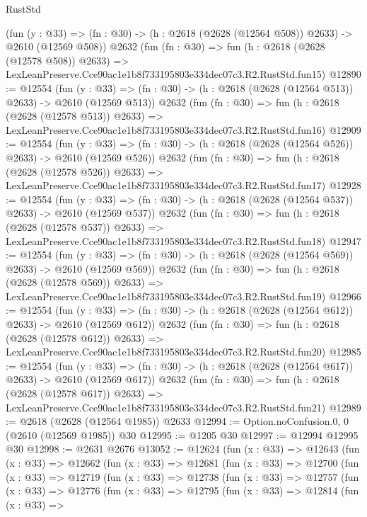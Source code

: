 \begin{lexlean}{RustStd}
\begin{coremodule}
    (fun (y : @33) => (fn : @30) -> (h : @2618 (@2628 (@12564 @508)) @2633) -> @2610 (@12569 @508))
    @2632
    (fun (fn : @30) =>
    fun (h : @2618 (@2628 (@12578 @508)) @2633) =>
    LexLeanPreserve.Cce90ac1e1b8f733195803e334dec07c3.R2.RustStd.fun15)
@12890 := @12554
    (fun (y : @33) => (fn : @30) -> (h : @2618 (@2628 (@12564 @513)) @2633) -> @2610 (@12569 @513))
    @2632
    (fun (fn : @30) =>
    fun (h : @2618 (@2628 (@12578 @513)) @2633) =>
    LexLeanPreserve.Cce90ac1e1b8f733195803e334dec07c3.R2.RustStd.fun16)
@12909 := @12554
    (fun (y : @33) => (fn : @30) -> (h : @2618 (@2628 (@12564 @526)) @2633) -> @2610 (@12569 @526))
    @2632
    (fun (fn : @30) =>
    fun (h : @2618 (@2628 (@12578 @526)) @2633) =>
    LexLeanPreserve.Cce90ac1e1b8f733195803e334dec07c3.R2.RustStd.fun17)
@12928 := @12554
    (fun (y : @33) => (fn : @30) -> (h : @2618 (@2628 (@12564 @537)) @2633) -> @2610 (@12569 @537))
    @2632
    (fun (fn : @30) =>
    fun (h : @2618 (@2628 (@12578 @537)) @2633) =>
    LexLeanPreserve.Cce90ac1e1b8f733195803e334dec07c3.R2.RustStd.fun18)
@12947 := @12554
    (fun (y : @33) => (fn : @30) -> (h : @2618 (@2628 (@12564 @569)) @2633) -> @2610 (@12569 @569))
    @2632
    (fun (fn : @30) =>
    fun (h : @2618 (@2628 (@12578 @569)) @2633) =>
    LexLeanPreserve.Cce90ac1e1b8f733195803e334dec07c3.R2.RustStd.fun19)
@12966 := @12554
    (fun (y : @33) => (fn : @30) -> (h : @2618 (@2628 (@12564 @612)) @2633) -> @2610 (@12569 @612))
    @2632
    (fun (fn : @30) =>
    fun (h : @2618 (@2628 (@12578 @612)) @2633) =>
    LexLeanPreserve.Cce90ac1e1b8f733195803e334dec07c3.R2.RustStd.fun20)
@12985 := @12554
    (fun (y : @33) => (fn : @30) -> (h : @2618 (@2628 (@12564 @617)) @2633) -> @2610 (@12569 @617))
    @2632
    (fun (fn : @30) =>
    fun (h : @2618 (@2628 (@12578 @617)) @2633) =>
    LexLeanPreserve.Cce90ac1e1b8f733195803e334dec07c3.R2.RustStd.fun21)
@12989 := @2618 (@2628 (@12564 @1985)) @2633
@12994 := Option.noConfusion.{0, 0} (@2610 (@12569 @1985)) @30
@12995 := @1205 @30
@12997 := @12994 @12995 @30
@12998 := @2631 @2676
@13052 := @12624
    (fun (x : @33) =>
    @12643
      (fun (x : @33) =>
      @12662
        (fun (x : @33) =>
        @12681
          (fun (x : @33) =>
          @12700
            (fun (x : @33) =>
            @12719
              (fun (x : @33) =>
              @12738
                (fun (x : @33) =>
                @12757
                  (fun (x : @33) =>
                  @12776
                    (fun (x : @33) =>
                    @12795
                      (fun (x : @33) =>
                      @12814
                        (fun (x : @33) =>

\end{coremodule}
\end{lexlean}
